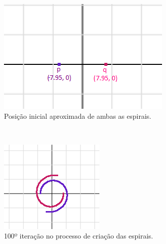 \begin{renumerate}
  \begin{figure}[!htp]
    \centering
    \begin{subfigure}[t]{0.3\textwidth}
        \centerline{\includegraphics[width=.9\textwidth]{img/cap1_ex6}}
        \caption{Posição inicial aproximada de ambas as espirais.}
        \label{fig:cap01_ex6a}
    \end{subfigure}
    ~
    \begin{subfigure}[t]{0.3\textwidth}
        \centerline{\includegraphics[width=.9\textwidth]{img/cap1_ex6b}}
        \caption{100º iteração no processo de criação das espirais.}
        \label{fig:cap01_ex6b}
    \end{subfigure}
    ~
    \begin{subfigure}[t]{0.3\textwidth}

\end{subfigure}
\end{figure}
\end{renumerate}

